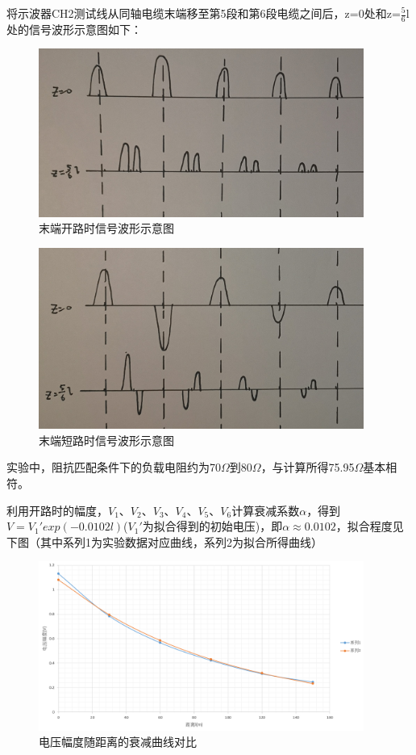 \documentclass[UTF8]{ctexart}
\begin{document}
将示波器CH2测试线从同轴电缆末端移至第5段和第6段电缆之间后，z=0处和z=$\frac{5}{6}$l处的信号波形示意图如下：
\begin{figure}[H]
\centering
\includegraphics[width=0.95\textwidth]{F.jpg}
\caption{末端开路时信号波形示意图}
\end{figure}

\begin{figure}[H]
\centering
\includegraphics[width=0.95\textwidth]{E.jpg}
\caption{末端短路时信号波形示意图}
\end{figure}


实验中，阻抗匹配条件下的负载电阻约为70$\Omega$到80$\Omega$，与计算所得75.95$\Omega$基本相符。

利用开路时的幅度，$V_1$、$V_2$、$V_3$、$V_4$、$V_5$、$V_6$计算衰减系数$\alpha$，得到$V=V_1'exp(-0.0102l)$($V_1'$为拟合得到的初始电压)，即$\alpha\approx0.0102$，拟合程度见下图（其中系列1为实验数据对应曲线，系列2为拟合所得曲线）
\begin{figure}[H]
\centering
\includegraphics[width=0.95\textwidth]{C.png}
\caption{电压幅度随距离的衰减曲线对比}
\end{figure}
\end{document}
